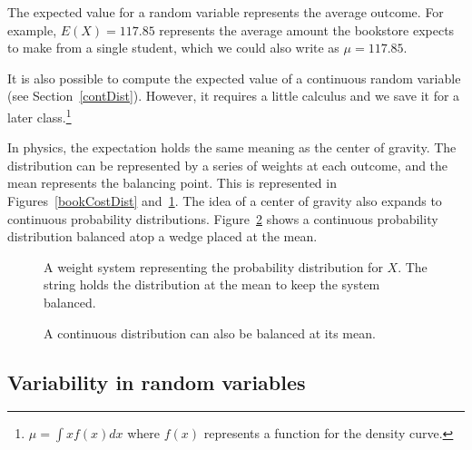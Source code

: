 \D{\newpage}

The expected value for a random variable represents the average outcome. For example, $E(X)=117.85$ represents the average amount the bookstore expects to make from a single student, which we could also write as $\mu=117.85$.

It is also possible to compute the expected value of a continuous random variable (see Section~\ref{contDist}). However, it requires a little calculus and we save it for a later class.\footnote{$\mu = \int xf(x)dx$ where $f(x)$ represents a function for the density curve.}

In physics, the expectation holds the same meaning as the center of gravity. The distribution can be represented by a series of weights at each outcome, and the mean represents the balancing point. This is represented in Figures~\ref{bookCostDist} and~\ref{bookWts}. The idea of a center of gravity also expands to continuous probability distributions. Figure~\ref{contBalance} shows a continuous probability distribution balanced atop a wedge placed at the mean.

\begin{figure}
\centering
{}
\caption{A weight system representing the probability distribution for $X$. The string holds the distribution at the mean to keep the system balanced.}
\label{bookWts}
\end{figure}

\begin{figure}
\centering
{}
\caption{A continuous distribution can also be balanced at its mean.}
\label{contBalance}
\end{figure}



\D{\newpage}

\subsection{Variability in random variables}

